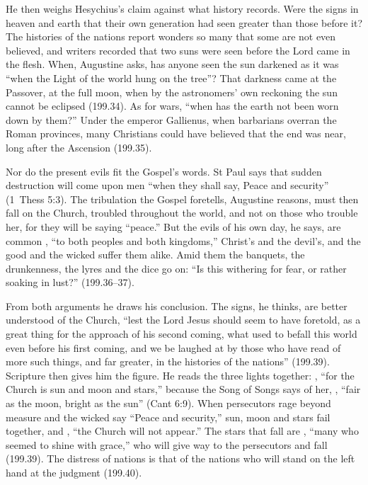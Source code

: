 He then weighs Hesychius's claim against what history records. Were the signs
in heaven and earth that their own generation had seen greater than those
before it? The histories of the nations report wonders so many that some are
not even believed, and writers recorded that two suns were seen before the
Lord came in the flesh. When, Augustine asks, has anyone seen the sun darkened
as it was ``when the Light of the world hung on the tree''? That darkness came
at the Passover, at the full moon, when by the astronomers' own reckoning the
sun cannot be eclipsed (199.34). As for wars, ``when has the earth not been
worn down by them?'' Under the emperor Gallienus, when barbarians overran the
Roman provinces, many Christians could have believed that the end was near,
long after the Ascension (199.35).

Nor do the present evils fit the Gospel's words. St Paul says that sudden
destruction will come upon men ``when they shall say, Peace and security''
(1~Thess 5:3). The tribulation the Gospel foretells, Augustine reasons, must
then fall on the Church, troubled throughout the world, and not on those who
trouble her, for they will be saying ``peace.'' But the evils of his own day,
he says, are common , ``to both peoples
and both kingdoms,'' Christ's and the devil's, and the good and the wicked
suffer them alike. Amid them the banquets, the drunkenness, the lyres and the
dice go on:  ``Is this withering for fear, or rather soaking in lust?''
(199.36--37).

From both arguments he draws his conclusion. The signs, he thinks, are better
understood of the Church, ``lest the Lord Jesus should seem to have foretold,
as a great thing for the approach of his second coming, what used to befall
this world even before his first coming, and we be laughed at by those who
have read of more such things, and far greater, in the histories of the
nations'' (199.39). Scripture then gives him the figure. He reads the three
lights together: , ``for the
Church is sun and moon and stars,'' because the Song of Songs says of her,
, ``fair as the moon, bright as
the sun'' (Cant 6:9). When persecutors rage beyond measure and the wicked say
``Peace and security,'' sun, moon and stars fail together, and
, ``the Church will not appear.'' The stars that
fall are , ``many who seemed to
shine with grace,'' who will give way to the persecutors and fall (199.39).
The distress of nations is that of the nations who will stand on the left hand
at the judgment (199.40).

